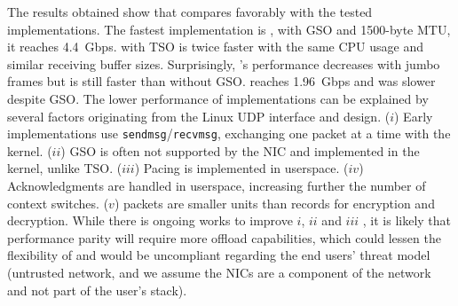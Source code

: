 The results obtained show that \tcpls compares favorably
with the tested \quic implementations. The fastest \quic implementation is
\quicly, with GSO and 1500-byte MTU, it reaches 4.4~Gbps. \tcpls with TSO is 
twice faster with the same CPU usage and similar 
receiving buffer sizes. Surprisingly, \quicly's performance decreases with
jumbo frames but is still faster than without GSO.  \msquic reaches
1.96~Gbps and \mvfst was slower despite GSO. 
The lower performance of \quic implementations can be explained by several 
factors originating from the Linux UDP interface and \quic design.
($i$) Early \quic implementations use \texttt{sendmsg}/\texttt{recvmsg}, 
exchanging one packet at a time with the kernel.
($ii$) GSO is often not supported by the NIC and implemented in the kernel, 
unlike TSO.
($iii$) Pacing is implemented in userspace.
($iv$) Acknowledgments are handled in userspace, increasing further the number 
of context switches.
($v$) \quic packets are smaller units than \tls records for encryption and 
decryption.
While there is ongoing works to improve $i$, $ii$ and $iii$ 
\cite{udp-gso-pacing}, it is likely that 
performance parity will require more offload capabilities, which could lessen 
the flexibility of \quic and would be uncompliant regarding the end users' 
threat model 
(untrusted network, and we assume the NICs are a component of the network and 
not part of the user's stack).





